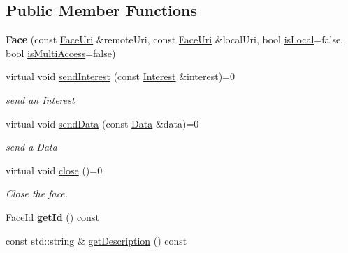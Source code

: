 \subsection*{Public Member Functions}
\begin{DoxyCompactItemize}
\item 
{\bfseries Face} (const \hyperlink{classndn_1_1util_1_1FaceUri}{Face\+Uri} \&remote\+Uri, const \hyperlink{classndn_1_1util_1_1FaceUri}{Face\+Uri} \&local\+Uri, bool \hyperlink{classnfd_1_1Face_a4c5a1c7822f13ad8650d804cf063b42a}{is\+Local}=false, bool \hyperlink{classnfd_1_1Face_a4c9f07c49193f0d97e6151d6bdef7d79}{is\+Multi\+Access}=false)\hypertarget{classnfd_1_1Face_a749c8f9fd3cfe37c0530cb3f841cc073}{}\label{classnfd_1_1Face_a749c8f9fd3cfe37c0530cb3f841cc073}

\item 
virtual void \hyperlink{classnfd_1_1Face_a99af95eec571f6942208758266d97aa2}{send\+Interest} (const \hyperlink{classndn_1_1Interest}{Interest} \&interest)=0\hypertarget{classnfd_1_1Face_a99af95eec571f6942208758266d97aa2}{}\label{classnfd_1_1Face_a99af95eec571f6942208758266d97aa2}

\begin{DoxyCompactList}\small\item\em send an Interest \end{DoxyCompactList}\item 
virtual void \hyperlink{classnfd_1_1Face_aad3b0b13c6e181548445e1401a535b75}{send\+Data} (const \hyperlink{classndn_1_1Data}{Data} \&data)=0\hypertarget{classnfd_1_1Face_aad3b0b13c6e181548445e1401a535b75}{}\label{classnfd_1_1Face_aad3b0b13c6e181548445e1401a535b75}

\begin{DoxyCompactList}\small\item\em send a Data \end{DoxyCompactList}\item 
virtual void \hyperlink{classnfd_1_1Face_a63f2c417cde23bf09441927951ef86d3}{close} ()=0
\begin{DoxyCompactList}\small\item\em Close the face. \end{DoxyCompactList}\item 
\hyperlink{classFaceId}{Face\+Id} {\bfseries get\+Id} () const\hypertarget{classnfd_1_1Face_a9b6a13fe4d0bdd8bf878ce6f2490106e}{}\label{classnfd_1_1Face_a9b6a13fe4d0bdd8bf878ce6f2490106e}

\item 
const std\+::string \& \hyperlink{classnfd_1_1Face_ab17c0ff1c0d620d789a88ff6c3389010}{get\+Description} () const\hypertarget{classnfd_1_1Face_ab17c0ff1c0d620d789a88ff6c3389010}{}\label{classnfd_1_1Face_ab17c0ff1c0d620d789a88ff6c3389010}


\end{DoxyCompactItemize}
